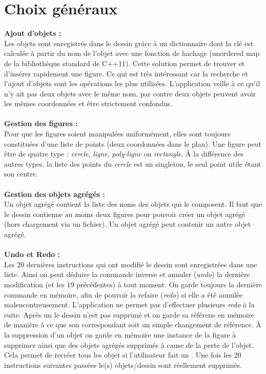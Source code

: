 \documentclass[legalpaper]{article}
\begin{document}
\section{Choix généraux}
\textbf{Ajout d'objets :} \\
\hspace*{\parindent}Les objets sont enregistrés dans le dessin grâce à un dictionnaire dont la clé est calculée à partir du nom de l'objet avec une fonction de hachage (unordered map de la bibliothèque standard de C++11).  Cette solution permet de trouver et d'insérer rapidement une figure. Ce qui est très intéressant car la recherche et l'ajout d'objets sont les opérations les plus utilisées. L'application veille à ce qu'il n'y ait pas deux objets avec le même nom, par contre deux objets peuvent avoir les mêmes coordonnées et être strictement confondus.\\
\\
\textbf{Gestion des figures :} \\
\hspace*{\parindent}Pour que les figures soient manipulées uniformément, elles sont toujours constituées d'une liste de points (deux coordonnées dans le plan). Une figure peut être de quatre type : \textit{cercle}, \textit{ligne}, \textit{poly-ligne} ou \textit{rectangle}. À la différence des autres types, la liste des points du \textit{cercle} est un singleton, le seul point utile étant son centre.\\
\\
\textbf{Gestion des objets agrégés :} \\
\hspace*{\parindent}Un objet agrégé contient la liste des noms des objets qui le composent. Il faut que le dessin contienne au moins deux figures pour pouvoir créer un objet agrégé (hors chargement via un fichier). Un objet agrégé peut contenir un autre objet agrégé.\\
\\
\textbf{Undo et Redo :} \\
\hspace*{\parindent}Les 20 dernières instructions qui ont modifié le dessin sont enregistrées dans une liste. Ainsi on peut déduire la commande inverse et annuler (\textit{undo}) la dernière modification (et les 19 précédentes) à tout moment. On garde toujours la dernière commande en mémoire, afin de pouvoir la refaire (\textit{redo}) si elle a été annulée malencontreusement. L'application ne permet pas d'effectuer plusieurs \textit{redo} à la suite. Après un  le dessin n'est pas supprimé et on garde sa référene en mémoire de manière à ce que son  correspondant soit un simple changement de référence. À la suppression d'un objet on garde en mémoire une instance de la figure à supprimer ainsi que des objets agrégés supprimés à cause de la perte de l'objet. Cela permet de recréer tous les objet si l'utilisateur fait un . Une fois les 20 instructions suivantes passées le(s) objets/dessin sont réellement supprimés.\\
\end{document}
